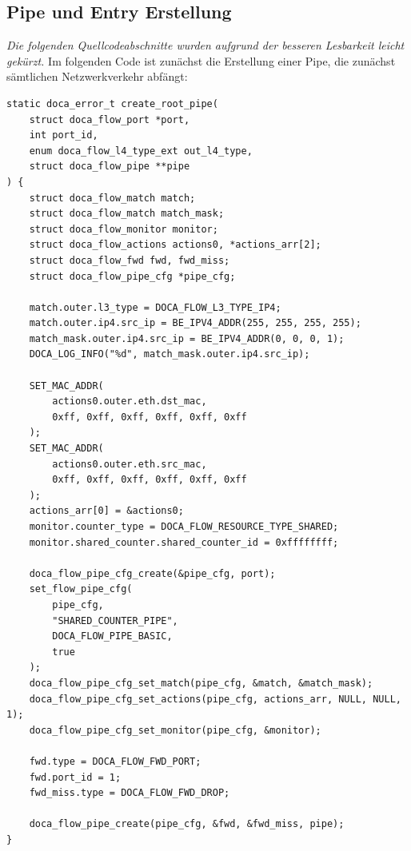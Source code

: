\subsection{Pipe und Entry Erstellung}
\textit{Die folgenden Quellcodeabschnitte wurden aufgrund der besseren Lesbarkeit leicht gekürzt.}
Im folgenden Code ist zunächst die Erstellung einer Pipe, die zunächst sämtlichen Netzwerkverkehr abfängt:
\begin{verbatim}
static doca_error_t create_root_pipe(
    struct doca_flow_port *port,
    int port_id,
    enum doca_flow_l4_type_ext out_l4_type,
    struct doca_flow_pipe **pipe
) {
    struct doca_flow_match match;
    struct doca_flow_match match_mask;
    struct doca_flow_monitor monitor;
    struct doca_flow_actions actions0, *actions_arr[2];
    struct doca_flow_fwd fwd, fwd_miss;
    struct doca_flow_pipe_cfg *pipe_cfg;
    
    match.outer.l3_type = DOCA_FLOW_L3_TYPE_IP4;
    match.outer.ip4.src_ip = BE_IPV4_ADDR(255, 255, 255, 255);
    match_mask.outer.ip4.src_ip = BE_IPV4_ADDR(0, 0, 0, 1);
    DOCA_LOG_INFO("%d", match_mask.outer.ip4.src_ip);
    
    SET_MAC_ADDR(
        actions0.outer.eth.dst_mac, 
        0xff, 0xff, 0xff, 0xff, 0xff, 0xff
    );
    SET_MAC_ADDR(
        actions0.outer.eth.src_mac, 
        0xff, 0xff, 0xff, 0xff, 0xff, 0xff
    );
    actions_arr[0] = &actions0;
    monitor.counter_type = DOCA_FLOW_RESOURCE_TYPE_SHARED;
    monitor.shared_counter.shared_counter_id = 0xffffffff;
    
    doca_flow_pipe_cfg_create(&pipe_cfg, port);
    set_flow_pipe_cfg(
        pipe_cfg, 
        "SHARED_COUNTER_PIPE", 
        DOCA_FLOW_PIPE_BASIC, 
        true
    );
    doca_flow_pipe_cfg_set_match(pipe_cfg, &match, &match_mask);
    doca_flow_pipe_cfg_set_actions(pipe_cfg, actions_arr, NULL, NULL, 1);
    doca_flow_pipe_cfg_set_monitor(pipe_cfg, &monitor);
    
    fwd.type = DOCA_FLOW_FWD_PORT;
    fwd.port_id = 1;
    fwd_miss.type = DOCA_FLOW_FWD_DROP;
    
    doca_flow_pipe_create(pipe_cfg, &fwd, &fwd_miss, pipe);
}
\end{verbatim}
